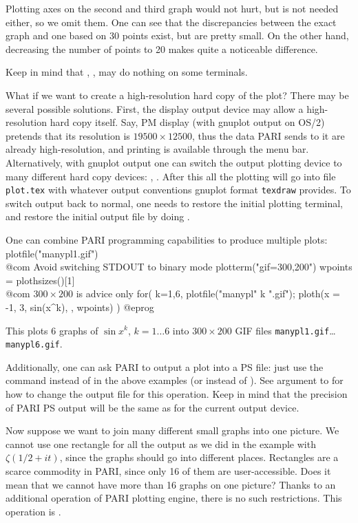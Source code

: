 \noindent Plotting axes on the second and third graph would not hurt, but
is not needed either, so we omit them.  One can see that the discrepancies
between the exact graph and one based on 30 points exist, but are pretty
small.  On the other hand, decreasing the number of points to 20 makes
quite a noticeable difference.

Keep in mind that , ,
 may do nothing on some terminals.  

What if we
want to create a high-resolution hard copy of the plot?  There may be several
possible solutions.  First, the display output device may allow a
high-resolution hard copy itself.  Say, PM display (with gnuplot output on
OS/2) pretends that its resolution is $19500\times 12500$, thus the data
PARI sends to it are already high-resolution, and printing is available
through the menu bar.  Alternatively, with gnuplot output one can switch
the output plotting device to many different hard copy devices:
, .
After this all the plotting will go into file {\tt plot.tex} with whatever
output conventions gnuplot format {\tt texdraw} provides.  To switch output
back to normal, one needs to restore the initial plotting terminal, and
restore the initial output file by doing .

One can combine PARI programming capabilities to produce multiple plots:
\bprog
plotfile("manypl1.gif")       \\@com Avoid switching STDOUT to binary mode
plotterm("gif=300,200")
wpoints = plothsizes()[1]     \\@com $300 \times 200$ is advice only
{
  for( k=1,6,
    plotfile("manypl" k ".gif");
    ploth(x = -1, 3, sin(x^k), , wpoints)
  )
}
@eprog

\noindent This plots 6 graphs of $\sin x^k$, $k=1\dots 6$ into 
$300\times 200$ GIF files {\tt manypl1.gif}\dots {\tt manypl6.gif}.

Additionally, one can ask PARI to output a plot into a PS file: just
use the command  instead of  in the above examples
(or  instead of ).  See  argument
to  for how to change the output file for this operation.  Keep
in mind that the precision of PARI PS output will be the same as for the
current output device.

Now suppose we want to join many different small graphs into one picture.
We cannot use one rectangle for all the output as we did in the example
with $\zeta({1/2}+it)$, since the graphs should go into different places.
Rectangles are a scarce commodity in PARI, since only 16 of them are
user-accessible.  Does it mean that we cannot have more than 16 graphs on
one picture?  Thanks to an additional operation of PARI plotting engine,
there is no such restrictions.  This operation is .

